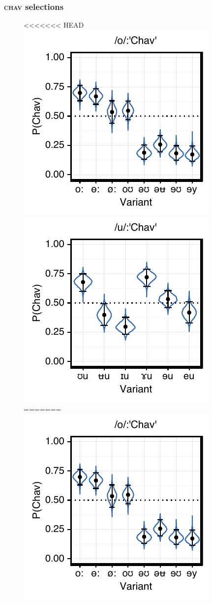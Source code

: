 \documentclass[PWPL]{article}
\begin{document}
\subsubsection{\textsc{chav} selections}
\begin{figure}[ht]
\centering
<<<<<<< HEAD
\includegraphics[scale=0.75]{ow_chav.pdf}
\includegraphics[scale=0.75]{uw_chav.pdf}
=======
\includegraphics[scale=0.8]{ow_chav.pdf}

\end{figure}
\end{document}
